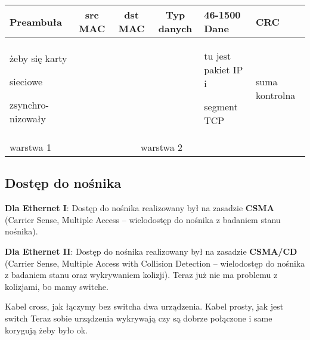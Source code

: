 \documentclass[../main.tex]{subfiles}
\begin{document}
    \begin{tabularx}{\textwidth}{ | X | c | c | c | X | X | }
        \hline
        Preambuła & src MAC & dst MAC & Typ danych & 46-1500 Dane & CRC\\
        \hline
        żeby się karty

        sieciowe

        zsynchro- nizowały & & & & tu jest pakiet IP i

        segment TCP & suma kontrolna\\
        \hline
        warstwa 1 & \multicolumn{4}{c}{warstwa 2 }&\\
        \hline
    \end{tabularx}

    \subsection{Dostęp do nośnika}

    \textbf{Dla Ethernet I}: Dostęp do nośnika realizowany był na zasadzie \textbf{CSMA} (Carrier Sense, Multiple Access – wielodostęp do nośnika z badaniem stanu nośnika).

    \textbf{Dla Ethernet II}: Dostęp do nośnika realizowany był na zasadzie \textbf{CSMA/CD} (Carrier Sense, Multiple Access with Collision Detection – wielodostęp do nośnika z badaniem stanu oraz wykrywaniem kolizji).
    Teraz już nie ma problemu z kolizjami, bo mamy switche.

    Kabel cross, jak łączymy bez switcha dwa urządzenia.
    Kabel prosty, jak jest switch
    Teraz sobie urządzenia wykrywają czy są dobrze połączone i same korygują żeby było ok.
\end{document}

